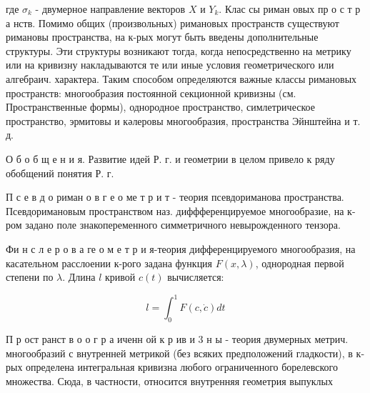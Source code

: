 \documentclass[10pt]{article}
\begin{document}
где $\sigma_{k}$ - двумерное направление векторов $X$ и $Y_{k}$. Клас сы риман овых пр о с т р а нств. Помимо общих (произвольных) римановых пространств существуют римановы пространства, на к-рых могут быть введены дополнительные структуры. Эти структуры возникают тогда, когда непосредственно на метрику или на кривизну накладываются те или иные условия геометрического или алгебраич. характера. Таким способом определяются важные классы римановых пространств: многообразия постоянной секционной кривизны (см. Пространственные формы), однородное пространство, симлетрическое пространство, эрмитовы и кәлеровы многообразия, пространства Эйнштейна и т. д.



О б о б щ е н и я. Развитие идей Р. г. и геометрии в целом привело к ряду обобщений понятия Р. г.



П с е в д о риман о в г е о ме т р и т - теория псевдориманова пространства. Псевдоримановым пространством наз. диффференцируемое многообразие, на к-ром задано поле знакопеременного симметричного невырожденного тензора.



Фи н с л е р о в а ге о м е т р и я-теория дифференцируемого многообразия, на касательном расслоении к-рого задана функция $F(x, \lambda)$, однородная первой степени по $\lambda$. Длина $l$ кривой $c(t)$ вычисляется:



\[

l=\int_{0}^{1} F(c, \dot{c}) d t

\]



П р ост ранст в о о г р а иченн ой к р ив и 3 н ы - теория двумерных метрич. многообразий с внутренней метрикой (без всяких предположений гладкости), в к-рых определена интегральная кривизна любого ограниченного борелевского множества. Сюда, в частности, относится внутренняя геометрия выпуклых
\end{document}
